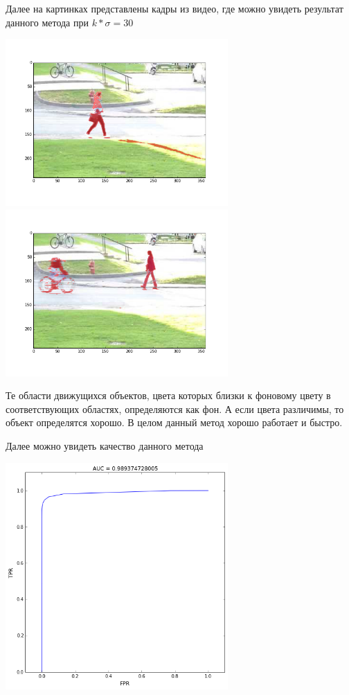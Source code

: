 \documentclass[12pt, a4paper]{article}
\begin{document}
			Далее на картинках представлены кадры из видео, где можно увидеть результат данного метода при $k * \sigma = 30$
			\begin{center}
				\includegraphics[width=8.5cm]{1par_vid_0.png}
				\includegraphics[width=8.5cm]{1par_vid_1.png}
			\end{center}

			Те области движущихся объектов, цвета которых близки к фоновому цвету в соответствующих областях, определяются как фон. А если цвета различимы, то объект определятся хорошо. В целом данный метод хорошо работает и быстро.

			Далее можно увидеть качество данного метода
			\begin{center}
				\includegraphics[width=8.5cm]{1par_auc.png}
			\end{center}
\end{document}
